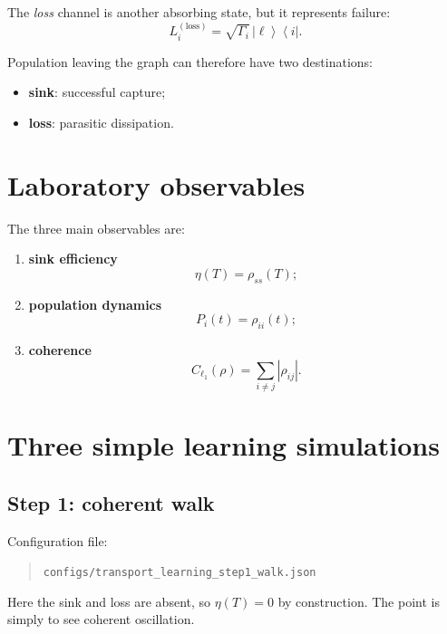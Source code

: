 \documentclass[11pt,a4paper]{article}
\newcommand{\ket}[1]{\left|#1\right\rangle}
\newcommand{\bra}[1]{\left\langle#1\right|}
\begin{document}
The \emph{loss} channel is another absorbing state, but it represents failure:
\begin{equation}
L_i^{(\mathrm{loss})} = \sqrt{\Gamma_i}\,\ket{\ell}\bra{i}.
\end{equation}

Population leaving the graph can therefore have two destinations:
\begin{itemize}
  \item \textbf{sink}: successful capture;
  \item \textbf{loss}: parasitic dissipation.
\end{itemize}

\section{Laboratory observables}

The three main observables are:
\begin{enumerate}
  \item \textbf{sink efficiency}
  \begin{equation}
  \eta(T)=\rho_{ss}(T);
  \end{equation}
  \item \textbf{population dynamics}
  \begin{equation}
  P_i(t)=\rho_{ii}(t);
  \end{equation}
  \item \textbf{coherence}
  \begin{equation}
  C_{\ell_1}(\rho)=\sum_{i\neq j}|\rho_{ij}|.
  \end{equation}
\end{enumerate}

\section{Three simple learning simulations}

\subsection{Step 1: coherent walk}

Configuration file:
\begin{quote}
\texttt{configs/transport\_learning\_step1\_walk.json}
\end{quote}

Here the sink and loss are absent, so $\eta(T)=0$ by construction. The point is
simply to see coherent oscillation.
\end{document}
